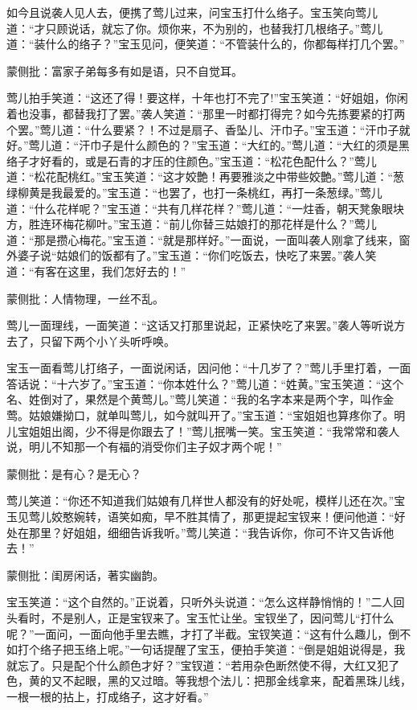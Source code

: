 \begin{parag}


    如今且说袭人见人去，便携了莺儿过来，问宝玉打什么络子。宝玉笑向莺儿道：“才只顾说话，就忘了你。烦你来，不为别的，也替我打几根络子。”莺儿道：“装什么的络子？”宝玉见问，便笑道：“不管装什么的，你都每样打几个罢。”\begin{note}蒙侧批：富家子弟每多有如是语，只不自觉耳。\end{note}莺儿拍手笑道：“这还了得！要这样，十年也打不完了!”宝玉笑道：“好姐姐，你闲着也没事，都替我打了罢。”袭人笑道：“那里一时都打得完？如今先拣要紧的打两个罢。”莺儿道：“什么要紧？！不过是扇子、香坠儿、汗巾子。”宝玉道：“汗巾子就好。”莺儿道：“汗巾子是什么颜色的？”宝玉道：“大红的。”莺儿道：“大红的须是黑络子才好看的，或是石青的才压的住颜色。”宝玉道：“松花色配什么？”莺儿道：“松花配桃红。”宝玉笑道：“这才姣艶！再要雅淡之中带些姣艶。”莺儿道：“葱绿柳黄是我最爱的。”宝玉道：“也罢了，也打一条桃红，再打一条葱绿。”莺儿道：“什么花样呢？”宝玉道：“共有几样花样？”莺儿道：“一炷香，朝天凳象眼块方，胜连环梅花柳叶。”宝玉道：“前儿你替三姑娘打的那花样是什么？”莺儿道：“那是攒心梅花。”宝玉道：“就是那样好。”一面说，一面叫袭人刚拿了线来，窗外婆子说“姑娘们的饭都有了。”宝玉道：“你们吃饭去，快吃了来罢。”袭人笑道：“有客在这里，我们怎好去的！”\begin{note}蒙侧批：人情物理，一丝不乱。\end{note}莺儿一面理线，一面笑道：“这话又打那里说起，正紧快吃了来罢。”袭人等听说方去了，只留下两个小丫头听呼唤。
\end{parag}


\begin{parag}


    宝玉一面看莺儿打络子，一面说闲话，因问他：“十几岁了？”莺儿手里打着，一面答话说：“十六岁了。”宝玉道：“你本姓什么？”莺儿道：“姓黄。”宝玉笑道：“这个名、姓倒对了，果然是个黄莺儿。”莺儿笑道：“我的名字本来是两个字，叫作金莺。姑娘嫌拗口，就单叫莺儿，如今就叫开了。”宝玉道：“宝姐姐也算疼你了。明儿宝姐姐出阁，少不得是你跟去了！”莺儿抿嘴一笑。宝玉笑道：“我常常和袭人说，明儿不知那一个有福的消受你们主子奴才两个呢！”\begin{note}蒙侧批：是有心？是无心？\end{note}莺儿笑道：“你还不知道我们姑娘有几样世人都没有的好处呢，模样儿还在次。”宝玉见莺儿姣憨婉转，语笑如痴，早不胜其情了，那更提起宝钗来！便问他道：“好处在那里？好姐姐，细细告诉我听。”莺儿笑道：“我告诉你，你可不许又告诉他去！”\begin{note}蒙侧批：闺房闲话，著实幽韵。\end{note}宝玉笑道：“这个自然的。”正说着，只听外头说道：“怎么这样静悄悄的！”二人回头看时，不是别人，正是宝钗来了。宝玉忙让坐。宝钗坐了，因问莺儿“打什么呢？”一面问，一面向他手里去瞧，才打了半截。宝钗笑道：“这有什么趣儿，倒不如打个络子把玉络上呢。”一句话提醒了宝玉，便拍手笑道：“倒是姐姐说得是，我就忘了。只是配个什么颜色才好？”宝钗道：“若用杂色断然使不得，大红又犯了色，黄的又不起眼，黑的又过暗。等我想个法儿：把那金线拿来，配着黑珠儿线，一根一根的拈上，打成络子，这才好看。”
\end{parag}


